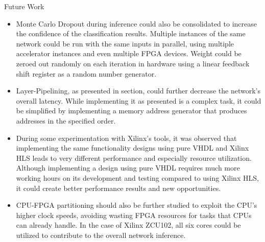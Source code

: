 \begin{frame}{Future Work}
\begin{itemize}
		\item Monte Carlo Dropout during inference could also be consolidated to increase the confidence of the classification results. Multiple instances of the same network could be run with the same inputs in parallel, using multiple accelerator instances and even multiple FPGA devices. Weight could be zeroed out randomly on each iteration in hardware using a linear feedback shift register as a random number generator.
		\item Layer-Pipelining, as presented in section, could further decrease the network's overall latency. While implementing it as presented is a complex task, it could be simplified by implementing a memory address generator that produces addresses in the specified order.
		\item During some experimentation with Xilinx's tools, it was observed that implementing the same functionality designs using pure VHDL and Xilinx HLS leads to very different performance and especially resource utilization. Although implementing a design using pure VHDL requires much more working hours on its development and testing compared to using Xilinx HLS, it could create better performance results and new opportunities.
		\item CPU-FPGA partitioning should also be further studied to exploit the CPU's higher clock speeds, avoiding wasting FPGA resources for tasks that CPUs can already handle. In the case of Xilinx ZCU102, all six cores could be utilized to contribute to the overall network inference.
	\end{itemize}
\end{frame}
